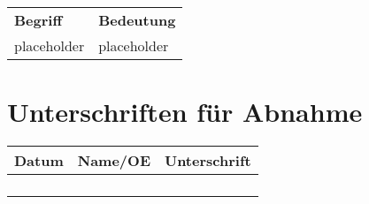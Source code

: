 \begin{tabular}{l | l}
    \textbf{Begriff} & \textbf{Bedeutung} \\
    placeholder      & placeholder \\
\end{tabular}

\chapter{Unterschriften für Abnahme}
\begin{comment}
    Lernende und Fachvorgesetzte haben die Dokumentation vor der Abgabe zu unterzeichnen und somit die Richtigkeit zu bezeugen (gelbes Deckblatt). Der FV hat die IPA abgenommen, und bewertet diese anschliessend.

    Achtung:
    - Das gelbe Deckblatt muss sowohl vom Lernenden wie auch vom Fachvorgesetzten unterschrieben sein.
    - Die blauen Deckblätter (für die Exemplare der Experten) müssen nicht unterschrieben werden.
\end{comment}

\begin{tabularx}{0.9\textwidth}{| X | X | X |}
    \hline
    \textbf{Datum} & \textbf{Name/OE} & \textbf{Unterschrift} \\
    \hline
                   & & \\
                   & & \\
    \hline
                   & & \\
                   & & \\
    \hline
\end{tabularx}
